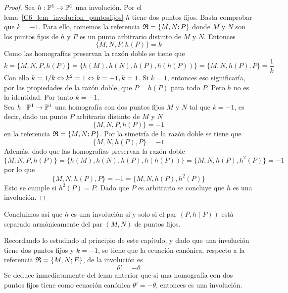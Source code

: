 \begin{proof}
	\bla \quad Sea $h:\mathbb{P}^1\rightarrow \mathbb{P}^1$ una involución. Por el lema~\ref{C6_lem_involucion_puntosfijos} $h$ tiene dos puntos fijos. Basta comprobar que $k=-1$. Para ello, tomemos la referencia $\mathfrak{R}=\{M,N;P\}$ donde $M$ y $N$ son los puntos fijos de $h$ y $P$  es un punto arbitrario distinto de $M$ y $N$. Entonces
	\begin{equation*}
		\{M,N,P,h(P)\}=k
	\end{equation*}
	Como las homografías preservan la razón doble se tiene que 
	\begin{equation*}
		k=\{M,N,P,h(P)\}=\{h(M),h(N),h(P),h(h(P))\}=\{M,N,h(P),P\}=\frac{1}{k}
	\end{equation*}
	Con ello $k=1/k\Leftrightarrow k^2=1\Leftrightarrow k=-1,k=1$. Si $k=1$, entonces eso significaría, por las propiedades de la razón doble, que $P=h(P)$ para todo $P$. Pero $h$ no es la identidad. Por tanto $k=-1$.\\
	
	\bra \quad Sea $h:\mathbb{P}^1\rightarrow \mathbb{P}^1$ una homografía con dos puntos fijos $M$ y $N$ tal que $k=-1$, es decir, dado un punto $P$ arbitrario distinto de $M$ y $N$ 
	\begin{equation*}
		\{M,N,P,h(P)\}=-1
	\end{equation*}
	en la referencia $\mathfrak{R}=\{M,N;P\}$. Por la simetría de la razón doble se tiene que
	\begin{equation*}
		\{M,N,h(P),P\}=-1
	\end{equation*}
	Además, dado que las homografías preservan la razón doble
	\begin{equation*}
		\{M,N,P,h(P)\}=\{h(M),h(N),h(P),h(h(P))\}=\{M,N,h(P),h^2(P)\}=-1
	\end{equation*}
	por lo que 
	\begin{equation*}
		\{M,N,h(P),P\}=-1=\{M,N,h(P),h^2(P)\}
	\end{equation*}
	Esto se cumple si $h^2(P)=P$. Dado que $P$ es arbitrario se concluye que $h$ es una involución.
\end{proof}

Concluimos así que $h$ es una involución si y solo si el par $(P,h(P))$ está separado armónicamente del par $(M,N)$ de puntos fijos.

Recordando lo estudiado al principio de este capítulo, y dado que una involución tiene dos puntos fijos y $k=-1$, se tiene que la ecuación canónica, respecto a la referencia $\mathfrak{R}=\{M,N;E\}$, de la involución es
\begin{equation}
	\theta'=-\theta
\end{equation}
Se deduce inmediatamente del lema anterior que si una homografía con dos puntos fijos tiene como ecuación canónica $\theta'=-\theta$, entonces es una involución.\\

